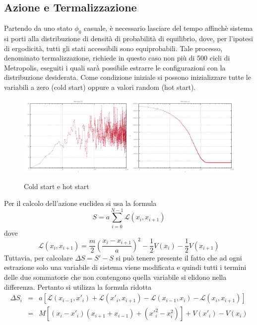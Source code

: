 \subsection{Azione e Termalizzazione}

Partendo da uno stato $\phi_0$ casuale, è necessario lasciare del tempo affinchè sistema si porti alla distribuzione di densità di probabilità di equilibrio, dove, per l'ipotesi di ergodicità, tutti gli stati accessibili sono equiprobabili. Tale processo, denominato termalizzazione, richiede in questo caso non più di 500 cicli di Metropolis, eseguiti i quali sarà possibile estrarre le configurazioni con la distribuzione desiderata. Come condizione iniziale si possono inizializzare tutte le variabili a zero (cold start) oppure a valori random (hot start).
\begin{figure}[H]
\centering
\includegraphics[width=0.5\textwidth]{action1}\includegraphics[width=0.5\textwidth]{action2}
\caption{Cold start e hot start}
\label{fig:action}
\end{figure}
Per il calcolo dell'azione euclidea si usa la formula
$$S = a\displaystyle\sum\limits_{i=0}^{N-1} \mathcal{L}(x_{i},x_{i+1})$$
dove
$$\mathcal{L}(x_{i},x_{i+1}) = \frac{m}{2}\left(\frac{x_{i}-x_{i+1}}{a}\right)^{2}-\frac{1}{2}V(x_{i})-\frac{1}{2}V(x_{i+1})$$
Tuttavia, per calcolare $\Delta S = S'-S$ si può tenere presente il fatto che ad ogni estrazione solo una variabile di sistema viene modificata e quindi tutti i termini delle due sommatorie che non contengono quella variabile si elidono nella differenza. Pertanto si utilizza la formula ridotta
\begin{eqnarray*}
 \Delta S_i &=& a[\mathcal{L}(x_{i-1},x'_{i})+\mathcal{L}(x'_{i},x_{i+1})-\mathcal{L}(x_{i-1},x_{i})-\mathcal{L}(x_{i},x_{i+1})]\\
   &=& M[(x_{i}-x'_{i})(x_{i+1}+x_{i-1})+(x'^2_i-x^2_i)]+V(x'_i)-V(x_i)
\end{eqnarray*}

